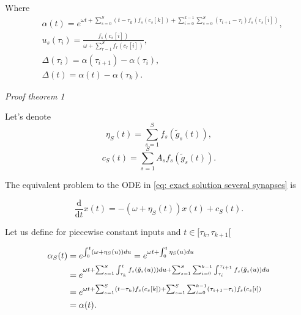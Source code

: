 \documentclass{article}
\begin{document}
\noindent Where
\begin{align*}
&\alpha(t) = e^{\omega t + \sum_{s=0}^{S} (t-\tau_k)f_s(c_s[k])+\sum_{i=0}^{k-1}\sum_{s=0}^{S} (\tau_{i+1}-\tau_i)f_s(c_s[i])}, \\
&u_s(\tau_i) = \frac{f_s(c_s[i])}{\omega + \sum_{r=1}^{S}  f_{r}(c_{r}[i])}, \\
&\Delta(\tau_i) =\alpha(\tau_{i+1}) - \alpha(\tau_i), \\ 
&\Delta(t) =\alpha(t) - \alpha(\tau_k). 
\end{align*}


\bigskip
\noindent \textit{Proof theorem 1}  

Let's denote 
\begin{equation}
    \eta_S(t) = \sum_{s=1}^S f_s(\tilde{g}_s(t)),
\end{equation}
\begin{equation}
c_S(t) = \sum_{s=1}^S A_s f_s(\tilde{g}_s(t)).
\end{equation}

The equivalent problem to the ODE in \eqref{eq: exact solution several synapses} is 

\begin{equation} \label{ode equivalent problem}
\frac{\mathrm{d}}{\mathrm{d}t} x(t)= - (\omega + \eta_S(t)) x (t) + c_S(t).    
\end{equation}

Let us define for piecewise constant inputs and $t \in [\tau_{k}, \tau_{k+1}[$

\begin{align}
\alpha_S(t) &= e^{\int_0^t (\omega+ \eta_S(u)) du} = e^{\omega t + \int_0^t \eta_S(u) du} \notag\\
&=e^{\omega t + \sum_{s=1}^{S} \int_{\tau_k}^{t} f_s(\tilde{g}_s(u))) du + \sum_{s=1}^{S} \sum_{i=0}^{k-1} \int_{\tau_i}^{\tau_{i+1}} f_s(\tilde{g}_s(u)) du} \notag\\
&= e^{\omega t + \sum_{s=1}^{S} (t-\tau_k)f_s(c_s[k]) + \sum_{s=1}^{S} \sum_{i=0}^{k-1} (\tau_{i+1}-\tau_i)f_s(c_s[i])} \notag \\
&= \alpha (t).
\end{align}
\end{document}
